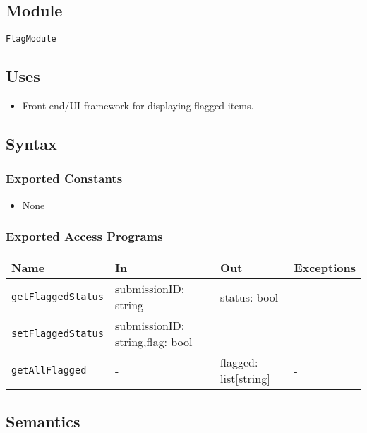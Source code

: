 \documentclass[12pt, titlepage]{article}
\begin{document}
\subsection{Module}

\texttt{FlagModule}

\subsection{Uses}

\begin{itemize}
    \item Front-end/UI framework for displaying flagged items.
\end{itemize}

\subsection{Syntax}

\subsubsection{Exported Constants}

\begin{itemize}
    \item None
\end{itemize}

\subsubsection{Exported Access Programs}

\begin{center}
\begin{tabular}{p{5cm} p{3.5cm} p{3.5cm} p{2cm}}
\hline
\textbf{Name} & \textbf{In} & \textbf{Out} & \textbf{Exceptions} \\
\hline
\texttt{getFlaggedStatus} & submissionID: string & status: bool & - \\
\texttt{setFlaggedStatus} & submissionID: string,flag: bool & - & - \\
\texttt{getAllFlagged} & - & flagged: list[string] & - \\
\hline
\end{tabular}
\end{center}

\subsection{Semantics}
\end{document}
